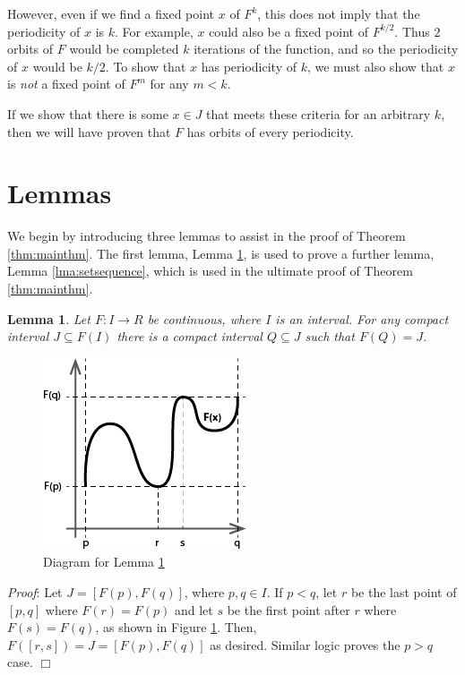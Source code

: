 \documentclass[12pt]{IEEEtran}
\newtheorem{lma}{Lemma}
\begin{document}
However, even if we find a fixed point $x$ of $F^k$, this does not imply that the periodicity of $x$ is $k$. For example, $x$ could also be a fixed point of $F^{k/2}$. Thus $2$ orbits of $F$ would be completed $k$ iterations of the function, and so the periodicity of $x$ would be $k/2$. To show that $x$ has periodicity of $k$, we must also show that $x$ is {\it not} a fixed point of $F^m$ for any $m < k$.

If we show that there is some $x \in J$ that meets these criteria for an arbitrary $k$, then we will have proven that $F$ has orbits of every periodicity.



\section{Lemmas}

We begin by introducing three lemmas to assist in the proof of Theorem \ref{thm:mainthm}. The first lemma, Lemma \ref{lma:cont_comp}, is used to prove a further lemma, Lemma \ref{lma:setsequence}, which is used in the ultimate proof of Theorem \ref{thm:mainthm}.

\begin{lma}
\label{lma:cont_comp}
	Let $F : I \rightarrow R$ be continuous, where $I$ is an interval. For any compact interval $J \subseteq F(I)$ there is a compact interval $Q \subseteq J$ such that $F(Q) = J$.
\end{lma}

\begin{figure}
	\begin{center}
		\includegraphics{img/continuity_graph.png}
		\caption{Diagram for Lemma \ref{lma:cont_comp}}
        \label{fig:continuity_graph}
	\end{center}
\end{figure}

{\it Proof}: Let $J = \left[ F \left( p \right), F \left( q \right) \right]$, where $p, q \in I$. If $p < q$, let $r$ be the last point of $\left[ p, q\right]$ where $F \left( r \right) = F \left( p \right)$ and let $s$ be the first point after $r$ where $F \left( s \right) = F \left( q \right)$, as shown in Figure \ref{fig:continuity_graph}. Then, $F \left( \left[ r, s\right] \right) = J = \left[ F \left( p \right), F \left( q \right) \right]$ as desired. Similar logic proves the $p > q$ case. $\Box$
\\
\end{document}

